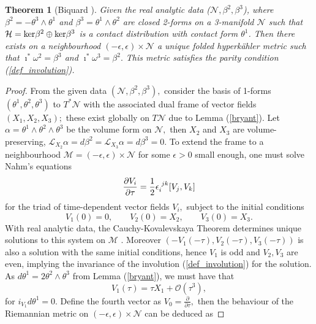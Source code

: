 \documentclass[a4paper,12pt, onecolumn, notitlepage]{article}
\newtheorem{thm}{Theorem}[]
\theoremstyle{definition}
\theoremstyle{remark}
\newcommand{\al}{\alpha}
\newcommand{\w}{\omega}
\newcommand{\e}{\epsilon}
\newcommand{\ddt}[1]{\frac{\partial #1}{\partial \tau}}
\newcommand{\HK}{hyperk\"ahler }
\begin{document}
\begin{thm}[Biquard \cite{biquard_2015}]
	\label{thm_biquard}
	Given the real analytic data ($\mathcal{N}, \beta^{2}, \beta^{3}$), where $\beta^{2}=-\theta^{3}\wedge \theta^{1}$ and $\beta^{3}=\theta^{1}\wedge \theta^{2}$ are closed 2-forms on a 3-manifold $\mathcal{N}$ such that $\mathcal{H}=\textnormal{ker}\beta^{2}\oplus\textnormal{ker}\beta^{3}$ is a contact distribution with contact form $\theta^{1}$. Then there exists on a neighbourhood $(-\e,\e)\times\mathcal{N}$ a unique folded \HK metric such that $\imath^{\ast}\w^{2}=\beta^{3}$ and $\imath^{\ast}\w^{3}=\beta^{2}.$ This metric satisfies the parity condition (\ref{def_involution}).
\end{thm}
\begin{proof}
	From the given data $(\mathcal{N},\beta^{2},\beta^{3}),$ consider the basis of 1-forms $(\theta^{1},\theta^{2},\theta^{3})$ to $T^{\ast}\mathcal{N}$ with the associated dual frame of vector fields $(X_{1},X_{2},X_{3});$ these exist globally on $T\mathcal{N}$ due to Lemma (\ref{bryant}). Let $\al=\theta^{1}\wedge\theta^{2}\wedge\theta^{3}$ be the volume form on $\mathcal{N},$ then $X_{2}$ and $X_{3}$ are volume-preserving, $\mathcal{L}_{X_2}\al=d\beta^{2}=\mathcal{L}_{X_3}\al=d\beta^{3}=0.$ To extend the frame to a neighbourhood $\mathcal{M}=(-\e,\e)\times\mathcal{N}$ for some $\e>0$ small enough, one must solve Nahm's equations
	\begin{equation*}
		\ddt{V_{i}}=\frac{1}{2}\e\indices{_i^j^k}[V_{j},V_{k}]
	\end{equation*}
	for the triad of time-dependent vector fields $V_{i},$ subject to the initial conditions
	\begin{equation*}
		V_{1}(0)=0,\qquad V_{2}(0)=X_{2},\qquad V_{3}(0) = X_{3}.
	\end{equation*}
	With real analytic data, the Cauchy-Kovalevskaya Theorem  determines unique solutions to this system on $\mathcal{M}$ \cite{evans_2010}. Moreover $(-V_{1}(-\tau),V_{2}(-\tau),V_{3}(-\tau))$ is also a solution with the same initial conditions, hence $V_{1}$ is odd and $V_{2}, V_{3}$ are even, implying the invariance of the involution (\ref{def_involution}) for the solution. As $d\theta^{1}=2\theta^{2}\wedge\theta^{3}$ from Lemma (\ref{bryant}), we must have that
	\begin{equation*}
		V_{1}(\tau) = \tau X_{1} + \mathcal{O}(\tau^{3}),
	\end{equation*}
	for $i_{V_{1}}d\theta^{1}=0.$ Define the fourth vector as $V_{0}=\ddt{},$ then the behaviour of the Riemannian metric on $(-\e,\e)\times\mathcal{N}$ can be deduced as

\end{proof}
\end{document}
